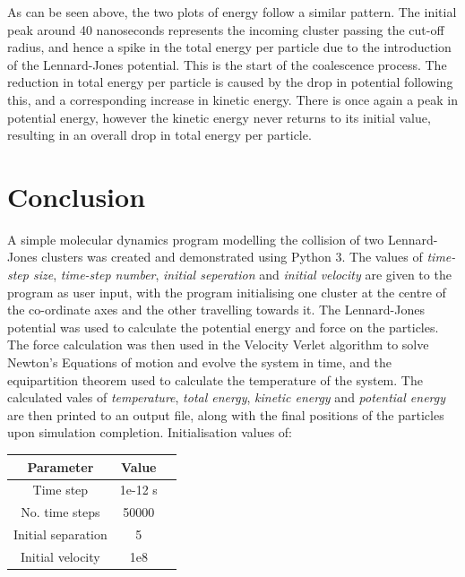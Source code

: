 \documentclass{article}
\begin{document}
	\begin{flushleft}
		
	
	As can be seen above, the two plots of energy follow a similar pattern. The initial peak around 40 nanoseconds represents the incoming cluster passing the cut-off radius, and hence a spike in the total energy per particle due to the introduction of the Lennard-Jones potential. This is the start of the coalescence process. The reduction in total energy per particle is caused by the drop in potential following this, and a corresponding increase in kinetic energy. There is once again a peak in potential energy, however the kinetic energy never returns to its initial value, resulting in an overall drop in total energy per particle.
	\end{flushleft}
\newpage
\twocolumn
\flushleft
\part{Conclusion}
A simple molecular dynamics program modelling the collision of two Lennard-Jones clusters was created and demonstrated using Python 3. The values of \textit{time-step size}, \textit{time-step number}, \textit{initial seperation} and \textit{initial velocity} are given to the program as user input, with the program initialising one cluster at the centre of the co-ordinate axes and the other travelling towards it. The Lennard-Jones potential was used to calculate the potential energy and force on the particles. The force calculation was then used in the Velocity Verlet algorithm to solve Newton's Equations of motion and evolve the system in time, and the equipartition theorem used to calculate the temperature of the system.  The calculated  vales of \textit{temperature}, \textit{total energy}, \textit{kinetic energy} and \textit{potential energy} are then printed to an output file, along with the final positions of the particles upon simulation completion. Initialisation values of:
\begin{center}
\begin{tabular}{ |c|c|c| } 
\hline
Parameter & Value \\
\hline
Time step & 1e-12 s\\ 
No. time steps & 50000 \\ 
Initial separation & 5\\ 
Initial velocity & 1e8\\
\hline
\end{tabular}
\end{center}
\end{document}
